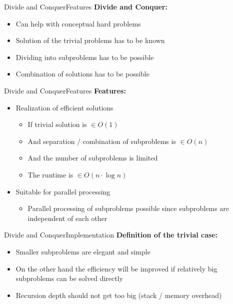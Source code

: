\begin{frame}{Divide and Conquer}{Features}
  \textbf{Divide and Conquer:}
  \begin{itemize}
    \item<2-| handout: 1>
      Can help with conceptual hard problems
    \item<3-| handout: 1>
      {\color{MainA}Solution} of the trivial problems has to be known
    \item<4-| handout: 1>
      {\color{MainA}Dividing} into subproblems has to be possible
    \item<5-| handout: 1>
      {\color{MainA}Combination} of solutions has to be possible
  \end{itemize}
\end{frame}


\begin{frame}{Divide and Conquer}{Features}
  \textbf{Features:}
  \begin{itemize}
    \item<1->
      Realization of {\color{MainA}efficient solutions}
      \begin{itemize}
        \item<2->
          If trivial solution is {\color{MainA}$\in O(1)$}
        \item<3->
          And separation / combination of subproblems is
          {\color{MainA}$\in O(n)$}
        \item<4->
          And the number of subproblems is limited
        \item<5->
          The runtime is {\color{MainA}$\in O(n \cdot \log n)$}
      \end{itemize}
    \item<6->
      Suitable for parallel processing
      \begin{itemize}
        \item<7->
          Parallel processing of subproblems possible since subproblems are {\color{MainA}independent} of each other
      \end{itemize}
  \end{itemize}
\end{frame}


\begin{frame}{Divide and Conquer}{Implementation}
  \textbf{Definition of the trivial case:}
  \begin{itemize}
    \item<2->
      Smaller subproblems are elegant and simple
    \item<3->
      On the other hand the efficiency will be improved if relatively big subproblems
      can be solved directly
    \item<4->
      Recursion depth should not get too big (stack / memory overhead)
  \end{itemize}
\end{frame}

